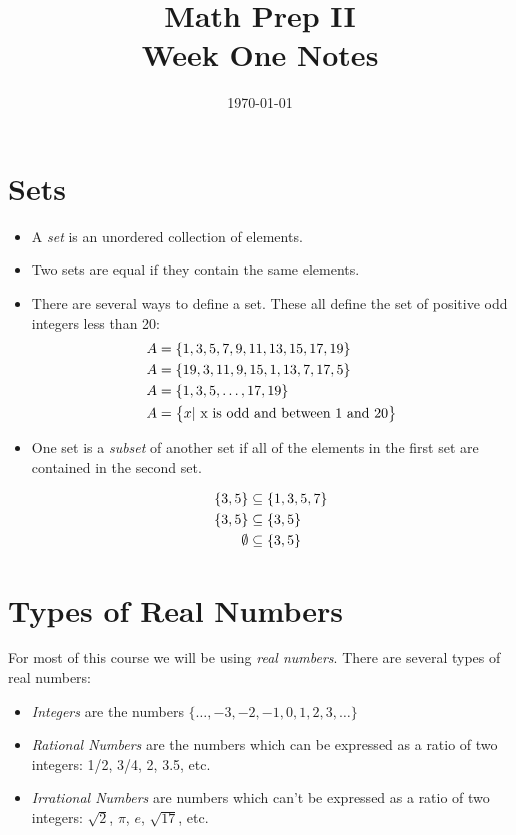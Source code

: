 \documentclass[letterpaper, landscape]{exam}
\title{Math Prep II \\ Week One Notes}
\author{}
\date{\today}
\begin{document}
  \maketitle

  \section{Sets}

  \begin{itemize}
    \item A {\em set} is an unordered collection of elements.  

    \item Two sets are equal if they contain the same elements.

    \item There are several ways to define a set.  These all define the set of positive odd integers less than 20:
      \begin{align*}
        A & = \cbr{ 1, 3, 5, 7, 9, 11, 13, 15, 17, 19 } \\
        A & = \cbr{ 19, 3, 11, 9, 15, 1, 13, 7, 17, 5 } \\
        A & = \cbr{ 1, 3, 5, \ldots, 17, 19 } \\
        A & = \cbr{ x | \text{ x is odd and between 1 and 20} } \\
      \end{align*}

    \item One set is a {\em subset} of another set if all of the elements in the first set are
      contained in the second set.

      \begin{align*}
        \cbr{ 3, 5 } & \subseteq \cbr{ 1, 3, 5, 7 } \\
        \cbr{ 3, 5 } & \subseteq \cbr{ 3, 5 } \\
        \emptyset    & \subseteq \cbr{ 3, 5 } \\
      \end{align*}
  \end{itemize}

  \section{Types of Real Numbers}

  For most of this course we will be using {\em real numbers}.  There are several types of real numbers:

  \begin{itemize}
    \item {\em Integers} are the numbers \( \{ \ldots, -3, -2, -1, 0, 1, 2, 3, \ldots \} \)
    \item {\em Rational Numbers} are the numbers which can be expressed as a ratio of two integers:
      1/2, 3/4, 2, 3.5, etc.
    \item {\em Irrational Numbers} are numbers which can't be expressed as a ratio of two integers:
      \( \sqrt{2} \), \( \pi \), \( e \), \( \sqrt{17}\), etc.
  \end{itemize}
\end{document}
